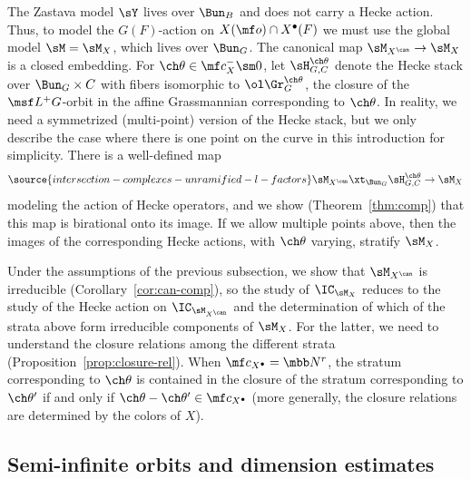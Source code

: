 The Zastava model $\sY$ lives over $\Bun_B$ and does not carry a Hecke action.
Thus, to model the $G(F)$-action on $X(\mf o)\cap X^\bullet(F)$ we must use the global model
$\sM=\sM_X$, which lives over $\Bun_G$.
The canonical map $\sM_{X^\can} \to \sM_X$ is a closed embedding.
For $\ch\theta \in \mf c_X^-\sm 0$, %
 let $\sH^{\ch\theta}_{G,C}$ denote the Hecke stack
over $\Bun_G \times C$ with fibers isomorphic to $\ol\Gr_G^{\ch\theta}$, the closure
of the $\msf L^+G$-orbit in the affine Grassmannian corresponding to $\ch\theta$.
In reality, we need a symmetrized (multi-point) version of the Hecke stack, but we only describe
the case where there is one point on the curve in this introduction for simplicity.
There is a well-defined map
\begin{equation}
 \label{e:Heckeaction}
\source{intersection-complexes-unramified-l-factors}
\sM_{X^\can} \xt_{\Bun_G} \sH_{G,C}^{\ch\theta} \to \sM_X
\end{equation}
modeling the action of Hecke operators, and we show (Theorem~\ref{thm:comp}) that this map is birational onto its image.
If we allow multiple points above, then the images of the corresponding Hecke actions, with $\ch\theta$ varying,
stratify $\sM_X$.

Under the assumptions of the previous subsection, we show that
$\sM_{X^\can}$ is irreducible (Corollary~\ref{cor:can-comp}), so the study
of $\IC_{\sM_X}$ reduces to the study of the Hecke action on $\IC_{\sM_{X^\can}}$ and
the determination of which of the strata above form irreducible components of $\sM_X$.
For the latter, we need to understand the closure relations among the different strata (Proposition~\ref{prop:closure-rel}). When $\mf c_{X^\bullet}=\mbb N^r$, the stratum corresponding to $\ch\theta$
is contained in the closure of the stratum corresponding to $\ch\theta'$ if and only if $\ch\theta-\ch\theta' \in \mf c_{X^\bullet}$ (more generally, the closure relations are determined by the colors of $X$).



\subsection{Semi-infinite orbits and dimension estimates}
\label{subsection-dimensions}

